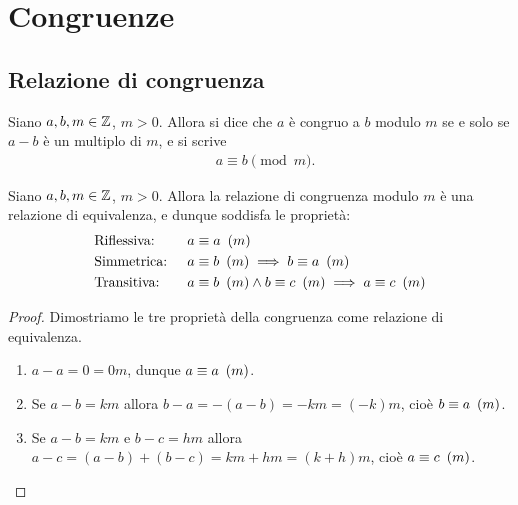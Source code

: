 \chapter{Congruenze}

\section{Relazione di congruenza}

\begin{definition} \label{def_congr}
    Siano $a, b, m \in \mathbb{Z}$, $m > 0$. Allora si dice che $a$ è congruo a $b$ modulo $m$ se e solo se $a - b$ è un multiplo di $m$, e si scrive
    \begin{align*}
        &a \equiv b \pmod m.
    \end{align*}
\end{definition}

\begin{theorem} 
    Siano $a, b, m \in \mathbb{Z}$, $m > 0$. Allora la relazione di congruenza modulo $m$ è una relazione di equivalenza, e dunque soddisfa le proprietà:
    \begin{align}
        &\text{Riflessiva: } &&a \equiv a \ \left(m\right) \label{congr_rifl}\\
        &\text{Simmetrica: } &&a \equiv b \ \left(m\right) \implies b \equiv a \ \left(m\right) \label{congr_simm}\\
        &\text{Transitiva: } &&a \equiv b \ \left(m\right) \land b \equiv c \ \left(m\right) \implies a \equiv c \ \left(m\right)  \label{congr_trans}
    \end{align}
\end{theorem}
\begin{proof} Dimostriamo le tre proprietà della congruenza come relazione di equivalenza.
    \begin{enumerate}
        \item $a - a = 0 = 0m$, dunque $a \equiv a \ \left(m\right)$.
        \item Se $a - b = km$ allora $b - a = -(a - b) = -km = (-k)m$, cioè $b \equiv a \ \left(m\right)$.
        \item Se $a - b = km$ e $b - c = hm$ allora $a - c = (a - b) + (b - c) = km + hm = (k + h)m$, 
            cioè $a \equiv c \ \left(m\right)$. \qedhere
    \end{enumerate}
\end{proof}

